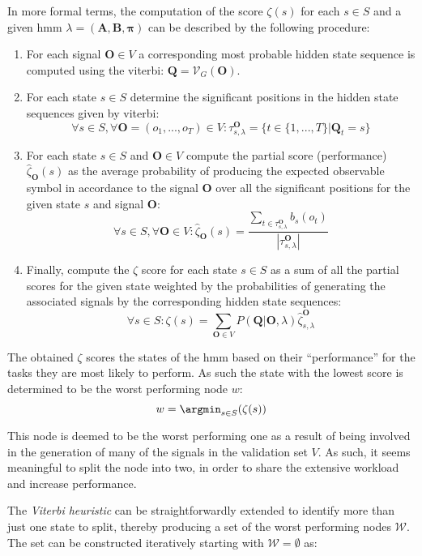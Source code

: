 In more formal terms, the computation of the score $\zeta(s)$ for each $s \in S$ and a given \gls{hmm} $\lambda = (\mathbf{A}, \mathbf{B}, \boldsymbol{\pi})$ can be described by the following procedure:
\begin{enumerate}
	\item For each signal $\mathbf{O}\in V$ a corresponding most probable hidden state sequence is computed using the \gls{viterbi}: $\mathbf{Q}=\mathcal{V}_G(\mathbf{O})$.
	\item For each state $s\in S$ determine the significant positions in the hidden state sequences given by \gls{viterbi}:
	$$\forall s\in S,\forall \mathbf{O}=(o_1, ..., o_T)\in V: \tau_{s, \lambda}^\mathbf{O}=\{t\in\{1, ..., T\}|\mathbf{Q}_t=s\}$$
	\item For each state $s \in S$  and $\mathbf{O}\in V$ compute the partial score (performance) $\hat\zeta_{\mathbf{O}}(s)$ as the average probability of producing the expected observable symbol in accordance to the signal $\mathbf{O}$ over all the significant positions for the given state $s$ and signal $\mathbf{O}$:
	$$\forall s\in S,\forall \mathbf{O}\in V: \hat{\zeta}_{\mathbf{O}}(s) = \frac{\sum_{t\in\tau_{s, \lambda}^{\mathbf{O}}}b_s(o_t)}{|\tau_{s, \lambda}^{\mathbf{O}}|}$$
	\item Finally, compute the $\zeta$ score for each state $s\in S$ as a sum of all the partial scores for the given state weighted by the probabilities of generating the associated signals by the corresponding hidden state sequences:
	$$\forall s\in S: \zeta(s)=\sum_{\mathbf{O}\in V}P(\mathbf{Q}|\mathbf{O}, \lambda)\hat\zeta_{s, \lambda}^{\mathbf{O}}$$
\end{enumerate}

The obtained $\zeta$ scores the states of the \gls{hmm} based on their ``performance'' for the tasks they are most likely to perform. As such the state with the lowest score is determined to be the worst performing node $w$: $$w = \argmin_{s\in S}(\zeta(s))$$

This node is deemed to be the worst performing one as a result of being involved in the generation of many of the signals in the validation set $V$. As such, it seems meaningful to split the node into two, in order to share the extensive workload and increase performance.

The \emph{Viterbi heuristic} can be straightforwardly extended to identify more than just one state to split, thereby producing a set of the worst performing nodes $\mathcal{W}$. The set can be constructed iteratively starting with $\mathcal{W} = \emptyset$ as:

